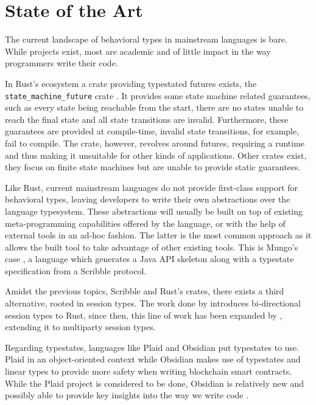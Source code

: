\section{State of the Art}\label{sec:state-of-the-art}

The current landscape of behavioral types in mainstream languages is bare.
While projects exist, most are academic and of little impact in the way programmers write their code.

In Rust's ecosystem a crate providing typestated futures exists,
the \texttt{state\_machine\_future} crate \autocite{Fitzgerald2019}.
It provides some state machine related guarantees, such as every state being reachable from the start,
there are no states unable to reach the final state and all state transitions are invalid.
Furthermore, these guarantees are provided at compile-time, invalid state transitions, for example, fail to compile.
The crate, however, revolves around futures, requiring a runtime and thus making it unsuitable for other kinds of applications.
Other crates exist, they focus on finite state machines but are unable to provide static guarantees.

Like Rust, current mainstream languages do not provide first-class support for behavioral types,
leaving developers to write their own abstractions over the language typesystem.
These abstractions will usually be built on top of existing meta-programming capabilities offered by the language,
or with the help of external tools in an ad-hoc fashion.
The latter is the most common approach as it allows the built tool to take advantage of other existing tools.
This is Mungo's case \autocite{Kouzapas2018, Voinea2020},
a language which generates a Java API skeleton along with a typestate specification from a
Scribble \autocite{Yoshida2014} protocol.

Amidst the previous topics, Scribble and Rust's crates, there exists a third alternative, rooted in session types.
The work done by \autocite{Jespersen2015, Munksgaard2015} introduces bi-directional session types to Rust,
since then, this line of work has been expanded by \autocite{Lagaillardie2020},
extending it to multiparty session types.

Regarding typestates, languages like Plaid \autocite{Aldrich2009} and Obsidian \autocite{Coblenz2020, Coblenz2020a}
put typestates to use. Plaid in an object-oriented context
while Obsidian makes use of typestates and linear types to provide more safety when writing blockchain smart contracts.
While the Plaid project is considered to be done,
Obsidian is relatively new and possibly able to provide key insights into the way we write code \autocite{Coblenz2020}.


